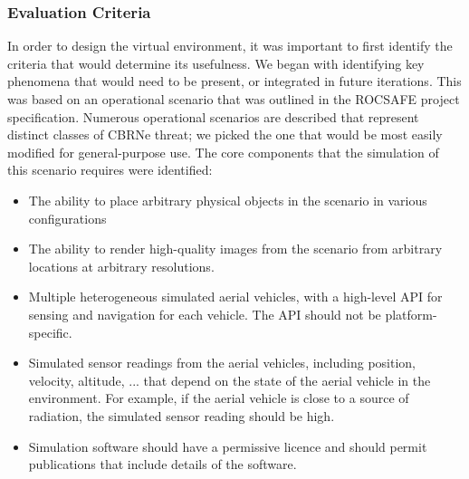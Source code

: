 
\subsubsection{Evaluation Criteria}
In order to design the virtual environment, it was important to first identify the criteria that would determine its usefulness. We began with identifying key phenomena that would need to be present, or integrated in future iterations. This was based on an operational scenario that was outlined in the ROCSAFE project specification\cite{rocsafeNUIG}. Numerous operational scenarios are described that represent distinct classes of CBRNe threat; we picked the one that would be most easily modified for general-purpose use. The core components that the simulation of this scenario requires were identified: 
\begin{itemize}
    \item The ability to place arbitrary physical objects in the scenario in various configurations
    \item The ability to render high-quality images from the scenario from arbitrary locations at arbitrary resolutions.
    \item Multiple heterogeneous simulated aerial vehicles, with a high-level API for sensing and navigation for each vehicle. The API should not be platform-specific.
    \item Simulated sensor readings from the aerial vehicles, including position, velocity, altitude, ... that depend on the state of the aerial vehicle in the environment. For example, if the aerial vehicle is close to a source of radiation, the simulated sensor reading should be high.
    \item Simulation software should have a permissive licence and should permit publications that include details of the software.
\end{itemize}

